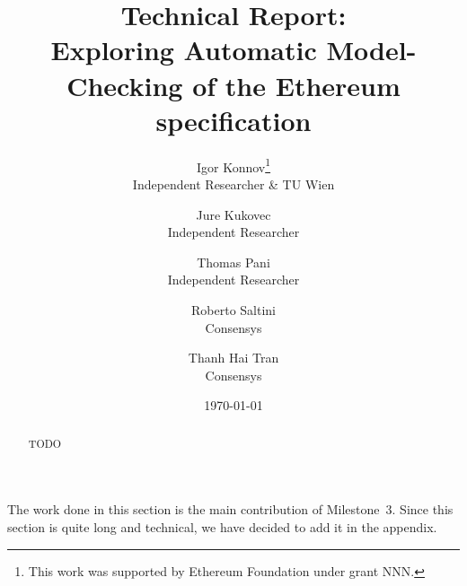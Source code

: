 \documentclass[12pt]{article}
\title{Technical Report:\\
       Exploring Automatic Model-Checking of the Ethereum specification}
\author{
    Igor Konnov\thanks{This work was supported by Ethereum Foundation
    under grant NNN.}\\ \small Independent Researcher \& TU Wien \\
    \and
    Jure Kukovec\footnotemark[1] \\ \small Independent Researcher \\
    \and
    Thomas Pani\footnotemark[1] \\ \small Independent Researcher\\
    \and
    Roberto Saltini \\ \small Consensys \\
    \and
    Thanh Hai Tran \\ \small Consensys
}
\date{\today}
\begin{document}
\maketitle

\begin{abstract}
    TODO
\end{abstract}

















\pagebreak

\appendix

The work done in this section is the main contribution of Milestone~3.  Since
this section is quite long and technical, we have decided to add it in the
appendix.




\end{document}
